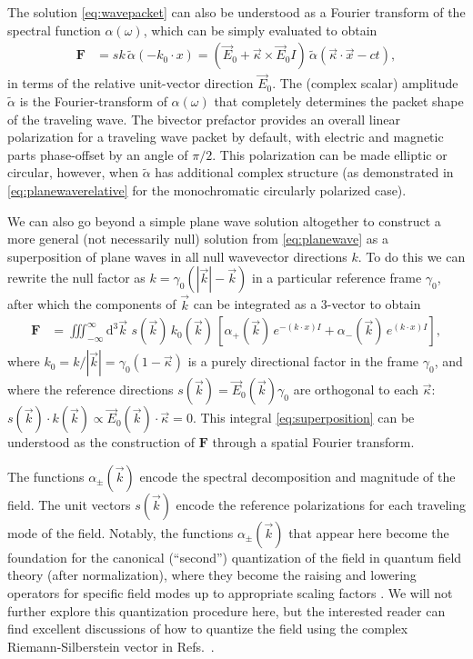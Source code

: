 \documentclass[1p,sort&compress]{elsarticle}
\numberwithin{equation}{section}
\newcommand{\rv}[1]{\vec{#1}}
\newcommand{\bv}[1]{\mathbf{#1}}
\begin{document}
The solution \eqref{eq:wavepacket} can also be understood as a Fourier transform of the spectral function $\alpha(\omega)$, which can be simply evaluated to obtain
\begin{align}\label{eq:fourierpacket}
  \bv{F} &= sk\, \widetilde{\alpha}(-k_0\cdot x) = (\rv{E}_0 + \rv{\kappa}\times\rv{E}_0I)\,\widetilde{\alpha}(\rv{\kappa}\cdot \rv{x} - ct),
\end{align}
in terms of the relative unit-vector direction $\rv{E}_0$.  The (complex scalar) amplitude $\widetilde{\alpha}$ is the Fourier-transform of $\alpha(\omega)$ that completely determines the packet shape of the traveling wave.  The bivector prefactor provides an overall linear polarization for a traveling wave packet by default, with electric and magnetic parts phase-offset by an angle of $\pi/2$.  This polarization can be made elliptic or circular, however, when $\widetilde{\alpha}$ has additional complex structure (as demonstrated in \eqref{eq:planewaverelative} for the monochromatic circularly polarized case).  

We can also go beyond a simple plane wave solution altogether to construct a more general (not necessarily null) solution from \eqref{eq:planewave} as a superposition of plane waves in all null wavevector directions $k$.  To do this we can rewrite the null factor as $k = \gamma_0(|\rv{k}| - \rv{k})$ in a particular reference frame $\gamma_0$, after which the components of $\rv{k}$ can be integrated as a 3-vector to obtain
\begin{align}\label{eq:superposition}
  \bv{F} &= \iiint_{-\infty}^\infty \! \textrm{d}^3\rv{k}\,\,s(\rv{k})\,k_0(\rv{k})\,[\alpha_+(\rv{k})\,e^{-(k\cdot x) I} + \alpha_-(\rv{k})\,e^{(k\cdot x) I}],
\end{align}
where $k_0 = k/|\rv{k}| = \gamma_0(1 - \rv{\kappa})$ is a purely directional factor in the frame $\gamma_0$, and where the reference directions $s(\rv{k}) = \rv{E}_0(\rv{k})\gamma_0$ are orthogonal to each $\rv{\kappa}$: $s(\rv{k})\cdot k(\rv{k}) \propto \rv{E}_0(\rv{k})\cdot\rv{\kappa} = 0$.  This integral \eqref{eq:superposition} can be understood as the construction of $\bv{F}$ through a spatial Fourier transform.

The functions $\alpha_\pm(\rv{k})$ encode the spectral decomposition and magnitude of the field.  The unit vectors $s(\rv{k})$ encode the reference polarizations for each traveling mode of the field.  Notably, the functions $\alpha_{\pm}(\rv{k})$ that appear here become the foundation for the canonical (``second'') quantization of the field in quantum field theory (after normalization), where they become the raising and lowering operators for specific field modes up to appropriate scaling factors \cite{Cohen1997}.  We will not further explore this quantization procedure here, but the interested reader can find excellent discussions of how to quantize the field using the complex Riemann-Silberstein vector in Refs.~\cite{Smith2007,Bialynicki-Birula2013}.
\end{document}
